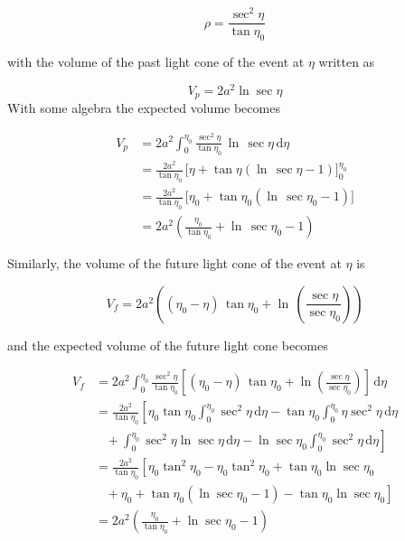 \documentclass[preprint,notitlepage,amsmath,amssymb,floatfix]{revtex4-1}
\begin{document}
\begin{equation}
\rho = \frac{\sec^2\eta}{\tan\eta_0}
\end{equation}

\noindent with the volume of the past light cone of the event at $\eta$ written as

\begin{equation}
V_p = 2a^2\ln\sec\eta
\end{equation}
\noindent With some algebra the expected volume becomes

\begin{equation}
\begin{split}
V_p &= 2a^2\int_0^{\eta_0}\!\frac{\sec^2\eta}{\tan\eta_0}\,\ln\,\sec\eta\,\mathrm{d}\eta \\
  &= \frac{2a^2}{\tan\eta_0}\,\lbrack\eta + \tan\eta\left(\ln\,\sec\eta - 1\right)\rbrack_0^{\eta_0} \\
  &= \frac{2a^2}{\tan\eta_0}\,\lbrack\eta_0 + \tan\eta_0\left(\ln\,\sec\eta_0 - 1\right)\rbrack \\
  &= 2a^2\left(\frac{\eta_0}{\tan\eta_0} + \ln\,\sec\eta_0 - 1\right)
\end{split}
\end{equation}

\noindent Similarly, the volume of the future light cone of the event at $\eta$ is

\begin{equation}
V_f = 2a^2\left(\left(\eta_0 - \eta\right)\,\tan\eta_0 + \ln\,\left(\frac{\sec\eta}{\sec\eta_0}\right)\right)
\end{equation}

\noindent and the expected volume of the future light cone becomes

\begin{equation}
\begin{split}
V_f &= 2a^2\int_0^{\eta_0} \! \frac{\sec^2\eta}{\tan\eta_0} \left[\left(\eta_0 - \eta\right)\,\tan\eta_0 + \ln\left(\frac{\sec\eta}{\sec\eta_0}\right) \right]\,\mathrm{d}\eta \\
  &= \frac{2a^2}{\tan\eta_0}\left[\eta_0\tan\eta_0\int_0^{\eta_0}\!\sec^2\eta\,\mathrm{d}\eta - \tan\eta_0 \int_0^{\eta_0}\!\eta\sec^2\eta\,\mathrm{d}\eta\right. \\ & \left.\,\,\,\,\, + \int_0^{\eta_0}\!\sec^2\eta\ln\sec\eta\,\mathrm{d}\eta - \ln\sec\eta_0\int_0^{\eta_0}\!\sec^2\eta\,\mathrm{d}\eta\right] \\
  &= \frac{2a^2}{\tan\eta_0}\left[\eta_0\tan^2\eta_0 - \eta_0\tan^2\eta_0 + \tan\eta_0\ln\sec\eta_0\right. \\ & \left.\,\,\,\,\, + \eta_0 + \tan\eta_0\left(\ln\sec\eta_0 - 1\right) - \tan\eta_0\ln\sec\eta_0\right] \\
  &= 2a^2\left(\frac{\eta_0}{\tan\eta_0} + \ln\sec\eta_0 - 1\right)
\end{split}
\end{equation}
\end{document}
